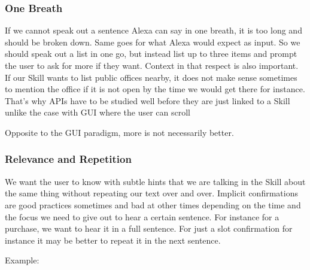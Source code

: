 \subsubsection*{One Breath}
If we cannot speak out a sentence Alexa can say in one breath, it is too long and should be broken down. Same goes for what Alexa would expect as input. %
So we should speak out a list in one go, but instead list up to three items and prompt the user to ask for more if they want. Context in that respect is also important. If our Skill wants to list public offices nearby, it does not make sense sometimes to mention the office if it is not open by the time we would get there for instance. That's why APIs have to be studied well before they are just linked to a Skill unlike the case with GUI where the user can scroll

Opposite to the GUI paradigm, more is not necessarily better.

\subsubsection*{Relevance and Repetition}

We want the user to know with subtle hints that we are talking in the Skill about the same thing without repeating our text over and over. Implicit confirmations are good practices sometimes and bad at other times depending on the time and the focus we need to give out to hear a certain sentence. For instance for a purchase, we want to hear it in a full sentence. For just a slot confirmation for instance it may be better to repeat it in the next sentence.

\noindent Example:




\begin{flushright}
\end{flushright}

